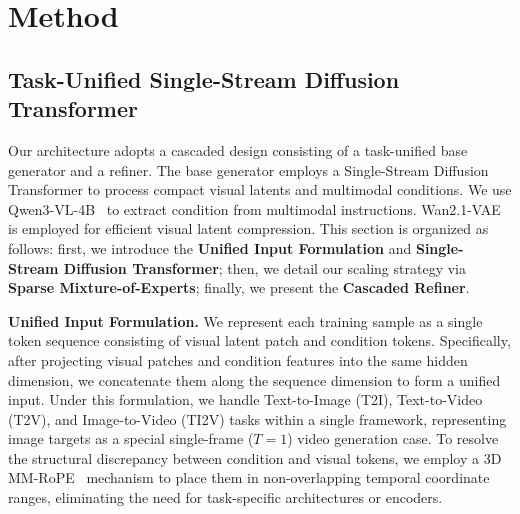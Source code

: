 \section{Method} \label{sec:method}

\subsection{Task-Unified Single-Stream Diffusion Transformer}
Our architecture adopts a cascaded design consisting of a task-unified base generator and a refiner.
The base generator employs a Single-Stream Diffusion Transformer to process compact visual latents and multimodal conditions.
We use Qwen3-VL-4B~\cite{Qwen3-VL} to extract condition from multimodal instructions.
Wan2.1-VAE~\cite{wan2025wan} is employed for efficient visual latent compression.
This section is organized as follows: first, we introduce the \textbf{Unified Input Formulation} and \textbf{Single-Stream Diffusion Transformer};
then, we detail our scaling strategy via \textbf{Sparse Mixture-of-Experts}; finally, we present the \textbf{Cascaded Refiner}.

\noindent\textbf{Unified Input Formulation.}
We represent each training sample as a single token sequence consisting of visual latent patch and condition tokens. Specifically, after projecting visual patches and condition features into the same hidden dimension, we concatenate them along the sequence dimension to form a unified input. Under this formulation, we handle Text-to-Image (T2I), Text-to-Video (T2V), and Image-to-Video (TI2V) tasks within a single framework, representing image targets as a special single-frame ($T=1$) video generation case. To resolve the structural discrepancy between condition and visual tokens, we employ a 3D MM-RoPE~\cite{qin2025lumina,wu2025omnigen2,cai2025z} mechanism to place them in non-overlapping temporal coordinate ranges, eliminating the need for task-specific architectures or encoders.

